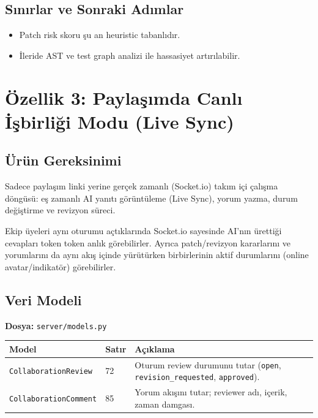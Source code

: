 \documentclass[11pt,a4paper]{article}
\begin{document}
\subsection{Sınırlar ve Sonraki Adımlar}
\begin{itemize}[leftmargin=1.5em]
  \item Patch risk skoru şu an heuristic tabanlıdır.
  \item İleride AST ve test graph analizi ile hassasiyet artırılabilir.
\end{itemize}

\section{Özellik 3: Paylaşımda Canlı İşbirliği Modu (Live Sync)}

\subsection{Ürün Gereksinimi}
Sadece paylaşım linki yerine gerçek zamanlı (Socket.io) takım içi çalışma döngüsü: eş zamanlı AI yanıtı görüntüleme (Live Sync), yorum yazma, durum değiştirme ve revizyon süreci.

\begin{notebox}
Ekip üyeleri aynı oturumu açtıklarında Socket.io sayesinde AI'nın ürettiği cevapları token token anlık görebilirler. Ayrıca patch/revizyon kararlarını ve yorumlarını da aynı akış içinde yürütürken birbirlerinin aktif durumlarını (online avatar/indikatör) görebilirler.
\end{notebox}

\subsection{Veri Modeli}

\textbf{Dosya:} \texttt{server/models.py}

\begin{tabularx}{\textwidth}{@{} L{4.5cm} C{1.5cm} X @{}}
\toprule
\textbf{Model} & \textbf{Satır} & \textbf{Açıklama} \\
\midrule
\texttt{CollaborationReview} & 72 & Oturum review durumunu tutar (\texttt{open}, \texttt{revision\_requested}, \texttt{approved}). \\
\addlinespace
\texttt{CollaborationComment} & 85 & Yorum akışını tutar; reviewer adı, içerik, zaman damgası. \\
\bottomrule
\end{tabularx}
\end{document}
